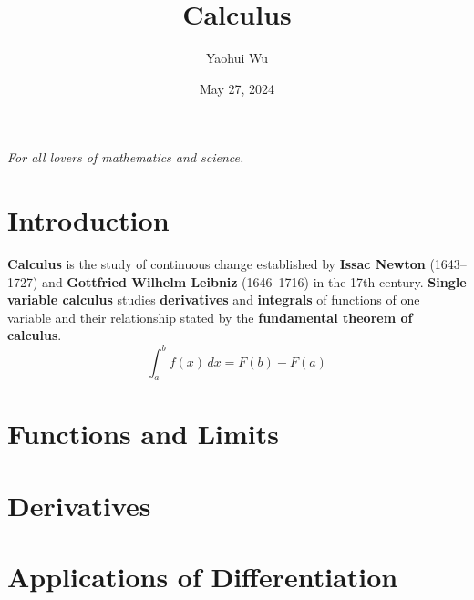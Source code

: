 \documentclass[12pt]{article}
\title{Calculus}
\author{Yaohui Wu}
\date{May 27, 2024}
\begin{document}
\maketitle

\begin{center}
    \textit{For all lovers of mathematics and science.}
\end{center}

\section*{Introduction}
\textbf{Calculus} is the study of continuous change established by
\textbf{Issac Newton} (1643--1727) and \textbf{Gottfried Wilhelm Leibniz}
(1646--1716) in the 17th century.
\textbf{Single variable calculus} studies \textbf{derivatives} and
\textbf{integrals} of functions of one variable and their relationship stated
by the \textbf{fundamental theorem of calculus}.
\[\int_a^b f(x) \,dx = F(b)-F(a)\]

\tableofcontents

\newpage
\section{Functions and Limits}






\section{Derivatives}






\section{Applications of Differentiation}




\end{document}
